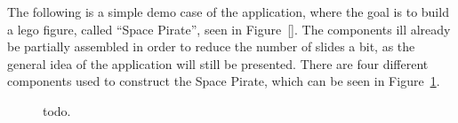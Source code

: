 The following is a simple demo case of the application, where the goal is to build a lego figure, called ``Space Pirate'', seen in Figure~\ref{}. The components ill already be partially assembled in order to reduce the number of slides a bit, as the general idea of the application will still be presented. There are four different components used to construct the Space Pirate, which can be seen in Figure~\ref{demoCaseRaw}.

	\begin{figure}[ht!]
		\centering
		\qquad
		\qquad
		\qquad
		\qquad
		\caption{todo.}
		\label{demoCaseRaw}
	\end{figure}


